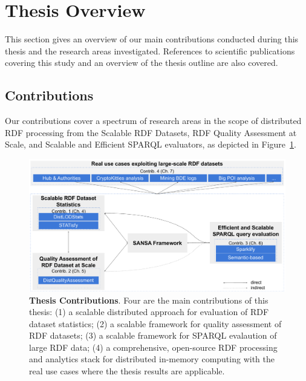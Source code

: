 \section{Thesis Overview}
\label{sec:thesis-overview}
This section gives an overview of our main contributions conducted during this thesis and the research areas investigated.
References to scientific publications covering this study and an overview of the thesis outline are also covered.

\subsection{Contributions}
Our contributions cover a spectrum of research areas in the scope of distributed \gls{RDF} processing from the Scalable \gls{RDF} Datasets, \gls{RDF} Quality Assessment at Scale, and Scalable and Efficient \gls{SPARQL} evaluators, as depicted in Figure~\ref{fig:thesis-contributions}.

\begin{figure}
\centering
\includegraphics[width=1.0\columnwidth]{images/1_introduction/thesis-contributions.pdf}
\caption{\textbf{Thesis Contributions}. Four are the main contributions of this thesis: (1) a scalable distributed approach for evaluation of RDF dataset statistics; (2) a scalable framework for quality assessment of RDF datasets; (3) a scalable framework for SPARQL evalaution of large RDF data; (4) a comprehensive, open-source RDF processing and analytics stack for distributed in-memory computing with the real use cases where the thesis results are applicable.}
\label{fig:thesis-contributions}
\end{figure}

